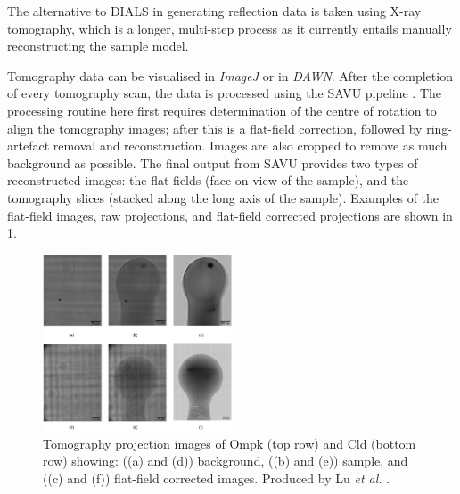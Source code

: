 
The alternative to DIALS in generating reflection data is taken using X-ray tomography, which is a longer, multi-step process as it currently entails manually reconstructing the sample model.

Tomography data can be visualised in \textit{ImageJ} or in \textit{DAWN}. After the completion of every tomography scan, the data is processed using the SAVU pipeline \cite{Kazantsev2022}. The processing routine here first requires determination of the centre of rotation to align the tomography images; after this is a flat-field correction, followed by ring-artefact removal and reconstruction. Images are also cropped to remove as much background as possible. The final output from SAVU provides two types of reconstructed images: the flat fields (face-on view of the sample), and the tomography slices (stacked along the long axis of the sample). Examples of the flat-field images, raw projections, and flat-field corrected projections are shown in \cref{fig:tomo projections}.

\begin{figure}
    \centering
    \includegraphics[width = 0.5\textwidth]{images/Tomo projection images CLD and Ompk high quality.png}
    \caption{Tomography projection images of Ompk (top row) and Cld (bottom row) showing: ((a) and (d)) background,  ((b) and (e)) sample, and ((c) and (f)) flat-field corrected images. Produced by Lu \textit{et al.} \cite{Lu2024}.}
    \label{fig:tomo projections}
\end{figure}

